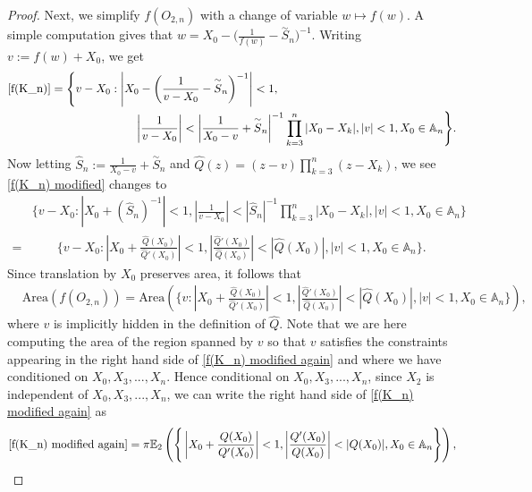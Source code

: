 \documentclass[9pt,a4paper,reqno]{amsart}
\newcommand{\tildea}[1]{\overset{\sim}{#1}}
\theoremstyle{mine}
\theoremstyle{definition}
\theoremstyle{remark}
\newcommand{\mb}{\mathbb}
\begin{document}
\begin{proof}
    Next, we simplify $f(O_{2,n})$ with a change of variable $w\mapsto f(w)$.
    A simple computation gives that $w= X_0-\Big( \frac{1}{f(w)}-\tildea{S}_n\Big)^{-1}$. Writing $ v := f(w)+X_0$, we get 
    \begin{align}\label{f(K_n) modified}
        \eqref{f(K_n)} & = \Bigg\{ v -X_0  :  \left| X_0 -  \left( \frac{1}{v-X_0}-\tildea{S}_n\right)^{-1} \right|<1, \nonumber \\
       & \hspace{1in}\left| \frac{1}{v-X_0} \right| < \left| \frac{1}{X_0-v} + \tildea{S}_n \right|^{-1} \prod_{k=3}^n|X_0-X_k|,   |v| < 1, X_0 \in \mb{A}_n\Bigg \}.
    \end{align}
    Now letting $ \widehat{S}_n:= \frac{1}{X_0-v}+\tildea{S}_n$ and $\widehat{Q}(z)=(z-v)\prod_{k=3}^n(z-X_k)$, we see \eqref{f(K_n) modified} changes to 
    \begin{align*}
        & \Bigg\{ v-X_0  :  \left| X_0 + \left( \widehat{S}_n\right)^{-1} \right|<1,\left| \frac{1}{v-X_0} \right| < \left|\widehat{S}_n \right|^{-1}\prod_{k=3}^n|X_0-X_k|,  |v| < 1, X_0 \in \mb{A}_n \Bigg \} \nonumber \\[1em]
        =& \qquad\bigg\{ v-X_0  :  \left| X_0 + \frac{\widehat{Q}(X_0)}{\widehat{Q}'(X_0)} \right|<1,\left| \frac{\widehat{Q}'(X_0)}{\widehat{Q}(X_0)} \right| < |\widehat{Q}(X_0)|,  |v| < 1, X_0 \in \mb{A}_n \bigg \}.
    \end{align*}
    Since translation by $X_0$ preserves area, it follows that
    \begin{align}\label{f(K_n) modified again}
      &\mbox{Area} ( f(O_{2,n})) = \mbox{Area} \left( \Bigg\{ v :  \left| X_0 + \frac{\widehat{Q}(X_0)}{\widehat{Q}'(X_0)} \right|<1,\left| \frac{\widehat{Q}'(X_0)}{\widehat{Q}(X_0)} \right| < |\widehat{Q}(X_0)|,  |v| < 1, X_0 \in \mb{A}_n \Bigg \} \right),
    \end{align}
where $v$ is implicitly hidden in the definition of $\widehat{Q}$. Note that we are here computing the area of the region spanned by $v$ so that $v$ satisfies the constraints appearing in the right hand side of \eqref{f(K_n) modified again} and where we have conditioned on $X_0, X_3, ..., X_n$. Hence conditional on $X_0, X_3, ..., X_n$, since $X_2$ is independent of $X_0, X_3, ..., X_n$, we can write the right hand side of \eqref{f(K_n) modified again} as 
\[ \eqref{f(K_n) modified again} = \pi \mb{E}_2\left( \Bigg\{  \left| X_0 + \frac{{Q}(X_0)}{{Q}'(X_0)} \right|<1,\left| \frac{{Q}'(X_0)}{{Q}(X_0)} \right| < |{Q}(X_0)|, X_0 \in \mb{A}_n \Bigg \} \right),\]


\end{proof}
\end{document}
